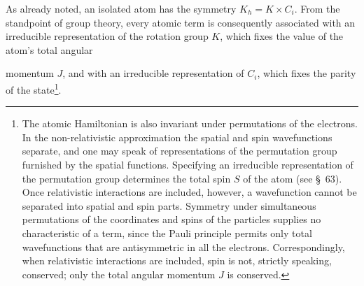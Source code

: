 As already noted, an isolated atom has the symmetry $K_h=K\times C_i$. From the standpoint of group theory, every atomic term is consequently associated with an irreducible representation of the rotation group $K$, which fixes the value of the atom's total angular

momentum $J$, and with an irreducible representation of $C_i$, which fixes the parity of the state\footnote{The atomic Hamiltonian is also invariant under permutations of the electrons. In the non-relativistic approximation the spatial and spin wavefunctions separate, and one may speak of representations of the permutation group furnished by the spatial functions. Specifying an irreducible representation of the permutation group determines the total spin $S$ of the atom (see §~63). Once relativistic interactions are included, however, a wavefunction cannot be separated into spatial and spin parts. Symmetry under simultaneous permutations of the coordinates and spins of the particles supplies no characteristic of a term, since the Pauli principle permits only total wavefunctions that are antisymmetric in all the electrons. Correspondingly, when relativistic interactions are included, spin is not, strictly speaking, conserved; only the total angular momentum $J$ is conserved.}.

